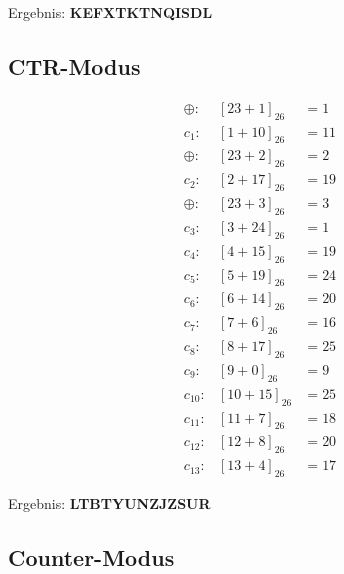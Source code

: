 \documentclass{../crypto}
\begin{document}
Ergebnis: \textbf{KEFXTKTNQISDL}

\subsection{CTR-Modus}
\begin{align*}
    \oplus: & \left[23+1\right]_{26} &= 1 \\
    c_{1}: & \left[1+10\right]_{26} &= 11\\
    \oplus: & \left[23+2\right]_{26} &= 2\\
    c_{2}: & \left[2+17\right]_{26} &= 19\\
    \oplus: & \left[23+3\right]_{26} &= 3\\
    c_{3}: & \left[3+24\right]_{26} &= 1\\
    c_{4}: & \left[4+15\right]_{26} &= 19\\
    c_{5}: & \left[5+19\right]_{26} &= 24\\
    c_{6}: & \left[6+14\right]_{26} &= 20\\
    c_{7}: & \left[7+6\right]_{26} &= 16\\
    c_{8}: & \left[8+17\right]_{26} &= 25\\
    c_{9}: & \left[9+0\right]_{26} &= 9\\
    c_{10}: & \left[10+15\right]_{26} &= 25\\
    c_{11}: & \left[11+7\right]_{26} &= 18\\
    c_{12}: & \left[12+8\right]_{26} &= 20\\
    c_{13}: & \left[13+4\right]_{26} &= 17
\end{align*}

Ergebnis: \textbf{LTBTYUNZJZSUR}

\subsection{Counter-Modus}
\end{document}

